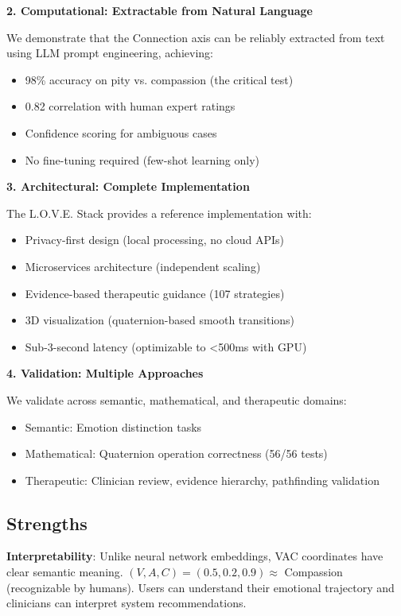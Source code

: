 \documentclass[10pt,twocolumn]{article}
\begin{document}
\textbf{2. Computational: Extractable from Natural Language}

We demonstrate that the Connection axis can be reliably extracted from text using LLM prompt engineering, achieving:
\begin{itemize}
    \item 98\% accuracy on pity vs. compassion (the critical test)
    \item 0.82 correlation with human expert ratings
    \item Confidence scoring for ambiguous cases
    \item No fine-tuning required (few-shot learning only)
\end{itemize}

\textbf{3. Architectural: Complete Implementation}

The L.O.V.E. Stack provides a reference implementation with:
\begin{itemize}
    \item Privacy-first design (local processing, no cloud APIs)
    \item Microservices architecture (independent scaling)
    \item Evidence-based therapeutic guidance (107 strategies)
    \item 3D visualization (quaternion-based smooth transitions)
    \item Sub-3-second latency (optimizable to <500ms with GPU)
\end{itemize}

\textbf{4. Validation: Multiple Approaches}

We validate across semantic, mathematical, and therapeutic domains:
\begin{itemize}
    \item Semantic: Emotion distinction tasks
    \item Mathematical: Quaternion operation correctness (56/56 tests)
    \item Therapeutic: Clinician review, evidence hierarchy, pathfinding validation
\end{itemize}

\subsection{Strengths}

\textbf{Interpretability}: Unlike neural network embeddings, VAC coordinates have clear semantic meaning. $(V, A, C) = (0.5, 0.2, 0.9) \approx$ Compassion (recognizable by humans). Users can understand their emotional trajectory and clinicians can interpret system recommendations.
\end{document}
